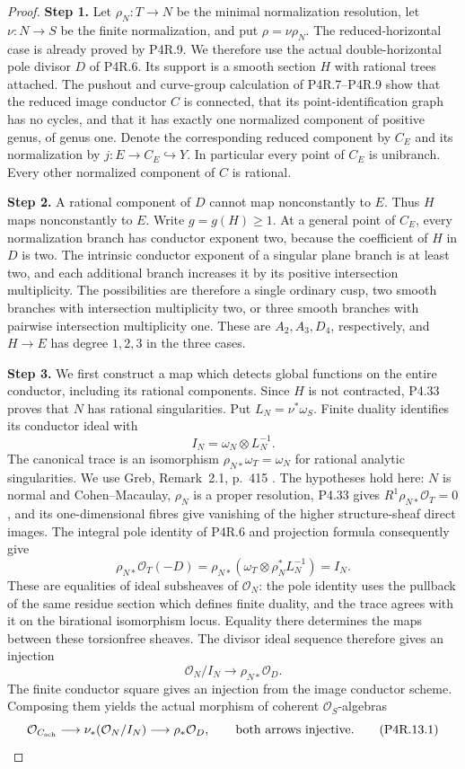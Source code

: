 \begin{proof}
\noindent\textbf{Step 1.} Let $\rho_N:T\to N$ be the minimal normalization resolution,
let $\nu:N\to S$ be the finite normalization, and put
$\rho=\nu\rho_N$. The reduced-horizontal case is already
proved by P4R.9. We therefore use the actual double-horizontal
pole divisor $D$ of P4R.6. Its support is a smooth section $H$
with rational trees attached. The pushout and curve-group
calculation of P4R.7--P4R.9 show that the reduced image
conductor $C$ is connected, that its point-identification
graph has no cycles, and that it has exactly one normalized
component of positive genus, of genus one. Denote the
corresponding reduced component by $C_E$ and its normalization
by $j:E\to C_E\hookrightarrow Y$. In particular every point
of $C_E$ is unibranch. Every other normalized component of
$C$ is rational.

\noindent\textbf{Step 2.} A rational component of $D$ cannot map nonconstantly to $E$.
Thus $H$ maps nonconstantly to $E$. Write $g=g(H)\ge1$.
At a general point of $C_E$, every normalization branch has
conductor exponent two, because the coefficient of $H$ in
$D$ is two. The intrinsic conductor exponent of a singular
plane branch is at least two, and each additional branch
increases it by its positive intersection multiplicity.
The possibilities are therefore a single ordinary cusp,
two smooth branches with intersection multiplicity two, or
three smooth branches with pairwise intersection multiplicity
one. These are $A_2,A_3,D_4$, respectively, and $H\to E$
has degree $1,2,3$ in the three cases.

\noindent\textbf{Step 3.} We first construct a map which detects global functions on
the entire conductor, including its rational components.
Since $H$ is not contracted, P4.33 proves that $N$ has
rational singularities. Put $L_N=\nu^*\omega_S$.
Finite duality identifies its conductor ideal with
\[
 I_N=\omega_N\otimes L_N^{-1}.
\]
The canonical trace is an isomorphism
$\rho_{N*}\omega_T=\omega_N$ for rational analytic
singularities. We use Greb, Remark~2.1, p.~415
\cite{Greb2011}. The hypotheses hold here: $N$ is normal
and Cohen--Macaulay, $\rho_N$ is a proper resolution,
P4.33 gives $R^1\rho_{N*}\mathcal O_T=0$, and its
one-dimensional fibres give vanishing of the higher
structure-sheaf direct images. The integral pole identity
of P4R.6 and projection formula consequently give
\[
 \rho_{N*}\mathcal O_T(-D)
 =\rho_{N*}(\omega_T\otimes\rho_N^*L_N^{-1})
 =I_N.
\]
These are equalities of ideal subsheaves of $\mathcal O_N$:
the pole identity uses the pullback of the same residue
section which defines finite duality, and the trace agrees
with it on the birational isomorphism locus. Equality there
determines the maps between these torsionfree sheaves.
The divisor ideal sequence therefore gives an injection
\[
 \mathcal O_N/I_N\longrightarrow\rho_{N*}\mathcal O_D.
\]
The finite conductor square gives an injection from the
image conductor scheme. Composing them yields the actual
morphism of coherent $\mathcal O_S$-algebras
\[
 \mathcal O_{C_{\rm sch}}\longrightarrow
 \nu_*(\mathcal O_N/I_N)\longrightarrow\rho_*\mathcal O_D,
 \qquad\hbox{both arrows injective}.                         \tag{P4R.13.1}
\]


\end{proof}
